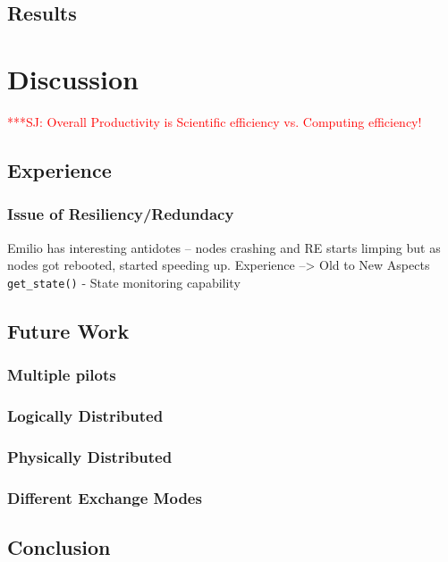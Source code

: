 \documentclass{sig-alternate}
\newcommand{\jhanote}[1]{ {\textcolor{red} { ***SJ: #1 }}}
\newcommand{\jhanote}[1]{}
\begin{document}
\subsection{Results}


\section{Discussion}

\jhanote{Overall Productivity is Scientific efficiency vs. Computing
  efficiency!}

\subsection{Experience}

\subsubsection{Issue of Resiliency/Redundacy} Emilio has interesting
antidotes -- nodes crashing and RE starts limping but as nodes got
rebooted, started speeding up.  Experience --> Old to New Aspects
\texttt{get\_state()} - State monitoring capability


\subsection{Future Work}

\subsubsection{Multiple pilots}

\subsubsection{Logically Distributed}
\subsubsection{Physically Distributed}

\subsubsection{Different Exchange Modes}


\subsection{Conclusion}
\end{document}
